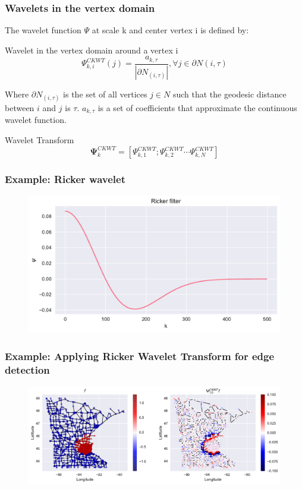 \documentclass{beamer}
\begin{document}
 \begin{frame}
   \frametitle{Wavelets in the vertex domain}
    The wavelet function $\Psi$ at scale k and center vertex i is defined by:

  \begin{block}{Wavelet in the vertex domain around a vertex i}
  \begin{equation}
  \Psi_{k,i}^{CKWT} (j) = \frac{a_{k, \tau}}{|\partial N_{(i, \tau)}|}, \forall j \in \partial N(i, \tau)
  \end{equation}
  \end{block}

  Where $\partial N_{(i, \tau)}$ is the set of all vertices $j \in N$ such that the geodesic distance between $i$ and $j$ is $\tau$. $a_{k, \tau}$ is a set of coefficients that approximate the continuous wavelet function. 

  \begin{block}{Wavelet Transform}
  \begin{equation}
  \mathbf{\Psi}_{k}^{CKWT} = [\Psi_{k,1}^{CKWT} ; \Psi_{k,2}^{CKWT} \cdots \Psi_{k,N}^{CKWT}]
  \end{equation}
  \end{block}
 
 \end{frame}
 
\begin{frame}
  \frametitle{Example: Ricker wavelet}
\begin{figure}
\includegraphics[width=0.9\linewidth]{../img/wavelet_filter_0.pdf}
\end{figure}
\end{frame}

\begin{frame}
  \frametitle{Example: Applying Ricker Wavelet Transform for edge detection}
\begin{figure}
\includegraphics[width=0.9\linewidth]{../img/wavelet_filter_1.pdf}
\end{figure}
\end{frame}
\end{document}
